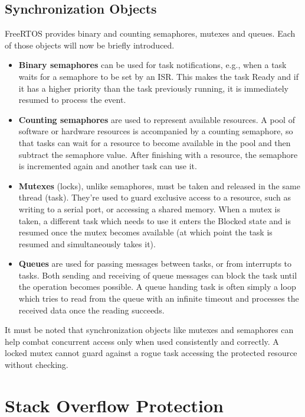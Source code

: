\subsection{Synchronization Objects}

FreeRTOS provides binary and counting semaphores, mutexes and queues. Each of those objects will now be briefly introduced.

\begin{itemize}
	\item \textbf{Binary semaphores} can be used for task notifications, e.g., when a task waits for a semaphore to be set by an \gls{ISR}. This makes the task Ready and if it has a higher priority than the task previously running, it is immediately resumed to process the event.

	\item  \textbf{Counting semaphores} are used to represent available resources. A pool of software or hardware resources is accompanied by a counting semaphore, so that tasks can wait for a resource to become available in the pool and then subtract the semaphore value. After finishing with a resource, the semaphore is incremented again and another task can use it.

	\item \textbf{Mutexes} (locks), unlike semaphores, must be taken and released in the same thread (task). They're used to guard exclusive access to a resource, such as writing to a serial port, or accessing a shared memory. When a mutex is taken, a different task which needs to use it enters the Blocked state and is resumed once the mutex becomes available (at which point the task is resumed and simultaneously takes it).

	\item \textbf{Queues} are used for passing messages between tasks, or from interrupts to tasks. Both sending and receiving of queue messages can block the task until the operation becomes possible. A queue handing task is often simply a loop which tries to read from the queue with an infinite timeout and processes the received data once the reading succeeds.
\end{itemize}

It must be noted that synchronization objects like mutexes and semaphores can help combat concurrent access only when used consistently and correctly. A locked mutex cannot guard against a rogue task accessing the protected resource without checking.

\section{Stack Overflow Protection}


